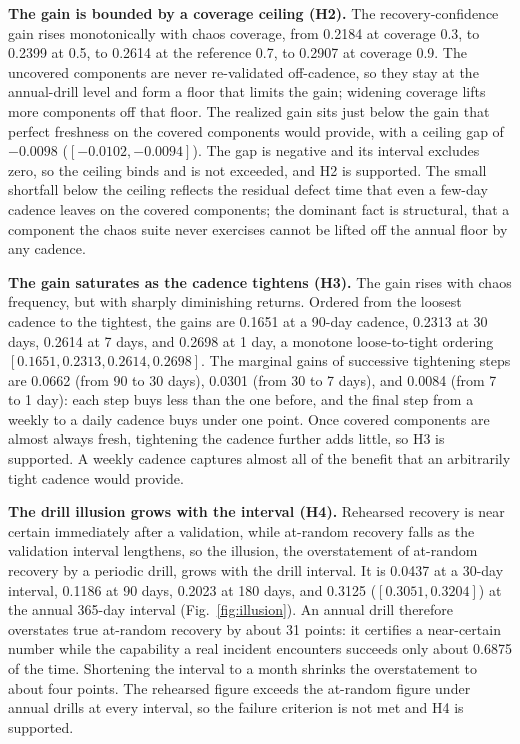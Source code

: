 \documentclass[journal]{IEEEtran}
\begin{document}
\textbf{The gain is bounded by a coverage ceiling (H2).} The recovery-confidence gain rises
monotonically with chaos coverage, from 0.2184 at coverage 0.3, to 0.2399 at 0.5, to 0.2614 at the
reference 0.7, to 0.2907 at coverage 0.9. The uncovered components are never re-validated
off-cadence, so they stay at the annual-drill level and form a floor that limits the gain; widening
coverage lifts more components off that floor. The realized gain sits just below the gain that
perfect freshness on the covered components would provide, with a ceiling gap of $-0.0098$
($[-0.0102, -0.0094]$). The gap is negative and its interval excludes zero, so the ceiling binds and
is not exceeded, and H2 is supported. The small shortfall below the ceiling reflects the residual
defect time that even a few-day cadence leaves on the covered components; the dominant fact is
structural, that a component the chaos suite never exercises cannot be lifted off the annual floor by
any cadence.

\textbf{The gain saturates as the cadence tightens (H3).} The gain rises with chaos frequency, but
with sharply diminishing returns. Ordered from the loosest cadence to the tightest, the gains are
0.1651 at a 90-day cadence, 0.2313 at 30 days, 0.2614 at 7 days, and 0.2698 at 1 day, a monotone
loose-to-tight ordering $[0.1651, 0.2313, 0.2614, 0.2698]$. The marginal gains of successive
tightening steps are 0.0662 (from 90 to 30 days), 0.0301 (from 30 to 7 days), and 0.0084 (from 7 to
1 day): each step buys less than the one before, and the final step from a weekly to a daily cadence
buys under one point. Once covered components are almost always fresh, tightening the cadence further
adds little, so H3 is supported. A weekly cadence captures almost all of the benefit that an
arbitrarily tight cadence would provide.

\textbf{The drill illusion grows with the interval (H4).} Rehearsed recovery is near certain
immediately after a validation, while at-random recovery falls as the validation interval lengthens,
so the illusion, the overstatement of at-random recovery by a periodic drill, grows with the drill
interval. It is 0.0437 at a 30-day interval, 0.1186 at 90 days, 0.2023 at 180 days, and 0.3125
($[0.3051, 0.3204]$) at the annual 365-day interval (Fig.~\ref{fig:illusion}). An annual drill
therefore overstates true at-random recovery by about 31 points: it certifies a near-certain number
while the capability a real incident encounters succeeds only about 0.6875 of the time. Shortening
the interval to a month shrinks the overstatement to about four points. The rehearsed figure exceeds
the at-random figure under annual drills at every interval, so the failure criterion is not met and
H4 is supported.
\end{document}

